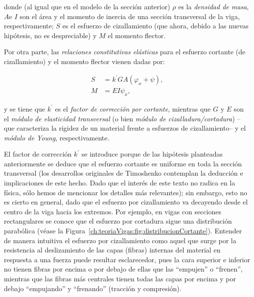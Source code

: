 donde (al igual que en el modelo de la sección anterior) $\rho$ es la \textit{densidad de masa}, $A$\footnotemark e $I$ son el área y el momento de inercia de una sección transversal de la viga, respectivamente; $S$ es el esfuerzo de cizallamiento (que ahora, debido a las nuevas hipótesis, no es despreciable) y $M$ el momento flector.  


Por otra parte, las \textit{relaciones constitutivas elásticas} para el esfuerzo cortante (de cizallamiento) y el momento flector vienen dadas por:

\begin{align}
    S &= k^{\prime}GA(\varphi_x + \psi), \label{timoshenkoBasico:relConstitutivasCortante}\\
    M &= EI \psi_x, \label{timoshenkoBasico:relConstitutivasFlector}
\end{align}

y se tiene que $k^{\prime}$ es el \textit{factor de corrección por cortante}, mientras que $G$ y $E$ son el \textit{módulo de elasticidad transversal} (o bien \textit{módulo de cizalladura/cortadura}) --que caracteriza la rigidez de un material frente a esfuerzos de cizallamiento-- y el \textit{módulo de Young}, respectivamente. 

El factor de corrección $k^{\prime}$ se introduce porque de las hipótesis planteadas anteriormente se deduce que el esfuerzo cortante es uniforme en toda la sección transversal (los desarrollos originales de Timoshenko \cite{timoshenko-1921-lxv-ion-cor,timoshenko-1922-x-ion-tra} contemplan la deducción e implicaciones de este hecho. Dado que el interés de este texto no radica en la física, sólo hemos de mencionar los detalles más relevantes); sin embargo, esto no es cierto en general, dado que el esfuerzo por cizallamiento va decayendo desde el centro de la viga hacia los extremos. Por ejemplo, en vigas con secciones rectangulares se conoce que el esfuerzo por cortadura sigue una distribución parabólica (véase la Figura~\ref{ch:teoriaVigas:fig:distribucionCortante}). Entender de manera intuitiva el esfuerzo por cizallamiento como aquel que surge por la resistencia al deslizamiento de las capas (fibras) internas del material en respuesta a una fuerza puede resultar esclarecedor, pues la cara superior e inferior no tienen fibras por encima o por debajo de ellas que las ``empujen'' o ``frenen'', mientras que las fibras más centrales tienen todas las capas por encima y por debajo ``empujando'' y ``frenando'' (tracción y compresión).

